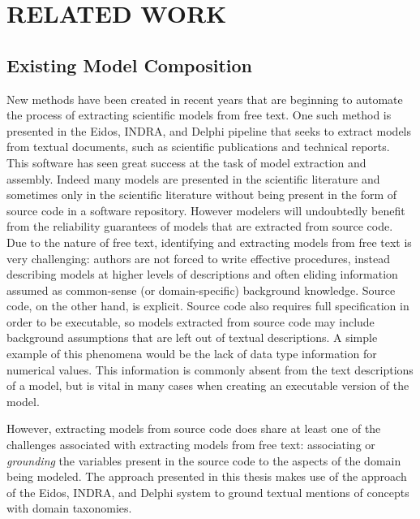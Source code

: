 \chapter{RELATED WORK\label{chapter:related_work}}
\section{Existing Model Composition\label{sec:bgrd_model_composition}}
New methods have been created in recent years that are beginning to automate the process of extracting scientific models from free text.
One such method is presented in the Eidos, INDRA, and Delphi \citep{EidosIndraDelphi} pipeline that seeks to extract models from textual documents, such as scientific publications and technical reports.
This software has seen great success at the task of model extraction and assembly.
Indeed many models are presented in the scientific literature and sometimes only in the scientific literature without being present in the form of source code in a software repository.
However modelers will undoubtedly benefit from the reliability guarantees of models that are extracted from source code.
Due to the nature of free text, identifying and extracting models from free text is very challenging: authors are not forced to write effective procedures, instead describing models at higher levels of descriptions and often eliding information assumed as common-sense (or domain-specific) background knowledge.
Source code, on the other hand, is explicit.
Source code also requires full specification in order to be executable, so models extracted from source code may include background assumptions that are left out of textual descriptions.
A simple example of this phenomena would be the lack of data type information for numerical values. This information is commonly absent from the text descriptions of a model, but is vital in many cases when creating an executable version of the model.

However, extracting models from source code does share at least one of the challenges associated with extracting models from free text:
associating or \emph{grounding} the variables present in the source code to the aspects of the domain being modeled.
The approach presented in this thesis makes use of the approach of the Eidos, INDRA, and Delphi system to ground textual mentions of concepts with domain taxonomies.

